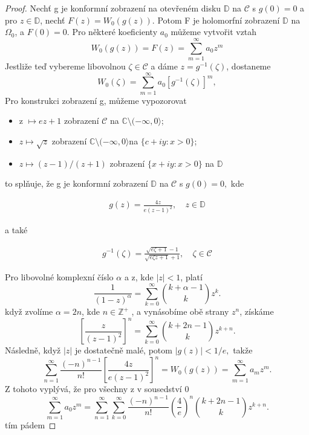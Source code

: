 \begin{proof}
        Nechť g je konformní zobrazení na otevřeném disku 
        \(\mathbb{D}\) na \(\mathcal{C}\) s \(g(0) = 0\) a
        pro \(z \in \mathbb{D}\), nechť \(F(z) = W_0(g(z))\).
        Potom F je holomorfní zobrazení \(\mathbb{D}\) na 
        \(\Omega_0\), a \(F(0) = 0\). Pro některé koeficienty
        \(a_0\) můžeme vytvořit vztah
        \[W_0(g(z)) = F(z) = \sum_{m=1}^\infty a_0 z^m\]
        Jestliže teď vybereme libovolnou \(\zeta \in \mathcal{C}\)
        a dáme \(z = g^{-1}(\zeta)\), dostaneme
        \[W_0(\zeta) = \sum_{m=1}^\infty a_0 [g^{-1}(\zeta)]^m,\]
        Pro konstrukci zobrazení g, můžeme vypozorovat
        \begin{itemize}
                \item z \(\mapsto ez +1\) zobrazení \(\mathcal{C}\)
                na \(\mathbb{C}\setminus (-\infty, 0 \rangle\);
                \item \(z \mapsto \sqrt{z}\) zobrazení \(\mathbb{C} 
                \setminus (-\infty, 0 \rangle \)na \(\{c+iy : x > 0\}\);
                \item \(z \mapsto (z-1)/(z+1)\) zobrazení \(\{x+iy
                : x > 0\} \) na  \(\mathbb{D}\)
        \end{itemize}
        
        to splňuje, že g je konformní zobrazení \(\mathbb{D}\)
        na \(\mathcal{C}\) s \(g(0) = 0,\) kde
        
        \begin{align*}
                g(z) = \frac{4z}{e(z-1)^2}, & \ z \in \mathbb{D}
        \end{align*}
        
        a také
        
        \begin{align*}
                g^{-1}(\zeta) = \frac{\sqrt{e\zeta + 1}-1}{
                \sqrt{e\zeta z+1}+1}, & \ \zeta \in \mathcal{C}
        \end{align*}
        
        Pro libovolné komplexní číslo \(\alpha\) a z, kde \(|z|<1\), platí
        \[ \frac{1}{(1-z)^\alpha} = \sum_{k=0}^\infty \binom{k+\alpha-1}{k}z^k.\]
        když zvolíme \(\alpha = 2n\), kde \(n \in \mathbb{Z}^+\) , a vynásobíme 
        obě strany \(z^n\), získáme
        \[ \left[ \frac{z}{(z-1)^2}\right]^n = \sum_{k=0}^\infty \binom{k+2n-1}{k}
        z^{k+n}.\]
        Následně, když \(|z|\) je dostatečně malé, potom \(|g(z)|<1/e,\) takže
        \[\sum_{n=1}^\infty \frac{(-n)^{n-1}}{n!} \left[ \frac{4z}{e(z-1)^2}
        \right]^n = W_0(g(z)) = \sum_{m=1}^\infty a_m z^m.\]
        Z tohoto vyplývá, že pro všechny z v sousedství 0
        \[\sum_{m=1}^\infty a_0z^m = \sum_{n=1}^\infty \sum_{k=0}^\infty 
        \frac{(-n)^{n-1}}{n!} \left( \frac{4}{e}\right)^n \binom{k+2n-1}{k}z^{k+n}.\]
        tím pádem
        

\end{proof}
